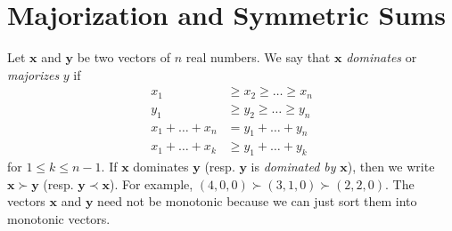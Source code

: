 \documentclass{subfile}
\begin{document}
	\section{Majorization and Symmetric Sums}\label{sec:mazorization}

	Let $\mathbf{x}$ and $\mathbf{y}$ be two vectors of $n$ real numbers. We say that $\mathbf{x}$ \textit{dominates} or \textit{majorizes} $y$ if
		\begin{align*}
			x_{1}
				& \geq x_{2}\geq \ldots\geq x_{n}\\
			y_{1}
				& \geq y_{2}\geq \ldots\geq y_{n}\\
			x_{1}+\ldots+x_{n}
				& = y_{1}+\ldots+y_{n}\\
			x_{1}+\ldots+x_{k}
				& \geq y_{1}+\ldots+y_{k}
		\end{align*}
	for $1\leq k\leq n-1$. If $\mathbf{x}$ dominates $\mathbf{y}$ (resp. $\mathbf{y}$ is \textit{dominated by} $\mathbf{x}$), then we write $\mathbf{x}\succ\mathbf{y}$ (resp. $\mathbf{y}\prec\mathbf{x}$). For example, $(4,0,0)\succ(3,1,0)\succ(2,2,0)$. The vectors $\mathbf{x}$ and $\mathbf{y}$ need not be monotonic because we can just sort them into monotonic vectors.
\end{document}
